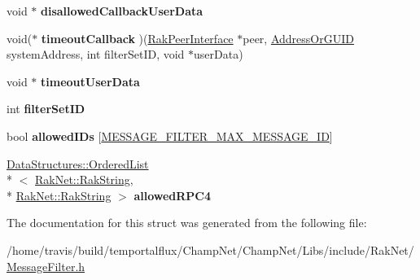 \begin{DoxyCompactItemize}
\item 
\hypertarget{struct_rak_net_1_1_filter_set_a129edc306a38a0da7f3c076ac57d080a}{void $\ast$ {\bfseries disallowed\-Callback\-User\-Data}}\label{struct_rak_net_1_1_filter_set_a129edc306a38a0da7f3c076ac57d080a}

\item 
\hypertarget{struct_rak_net_1_1_filter_set_a88e95116f31bcc26c9d7503fade848ce}{void($\ast$ {\bfseries timeout\-Callback} )(\hyperlink{class_rak_net_1_1_rak_peer_interface}{Rak\-Peer\-Interface} $\ast$peer, \hyperlink{struct_rak_net_1_1_address_or_g_u_i_d}{Address\-Or\-G\-U\-I\-D} system\-Address, int filter\-Set\-I\-D, void $\ast$user\-Data)}\label{struct_rak_net_1_1_filter_set_a88e95116f31bcc26c9d7503fade848ce}

\item 
\hypertarget{struct_rak_net_1_1_filter_set_a02579ee5db3d7cca001ee01515a26f77}{void $\ast$ {\bfseries timeout\-User\-Data}}\label{struct_rak_net_1_1_filter_set_a02579ee5db3d7cca001ee01515a26f77}

\item 
\hypertarget{struct_rak_net_1_1_filter_set_ad6e9bb439128307cbb82670ae4255fd8}{int {\bfseries filter\-Set\-I\-D}}\label{struct_rak_net_1_1_filter_set_ad6e9bb439128307cbb82670ae4255fd8}

\item 
\hypertarget{struct_rak_net_1_1_filter_set_af20d254436462095f204009313ec6b5a}{bool {\bfseries allowed\-I\-Ds} \mbox{[}\hyperlink{_message_filter_8h_ae4d315ced89fd4074f5e3b1b3e2a4e29}{M\-E\-S\-S\-A\-G\-E\-\_\-\-F\-I\-L\-T\-E\-R\-\_\-\-M\-A\-X\-\_\-\-M\-E\-S\-S\-A\-G\-E\-\_\-\-I\-D}\mbox{]}}\label{struct_rak_net_1_1_filter_set_af20d254436462095f204009313ec6b5a}

\item 
\hypertarget{struct_rak_net_1_1_filter_set_a6433375f96cb61c3f46a6de1c787a9f0}{\hyperlink{class_data_structures_1_1_ordered_list}{Data\-Structures\-::\-Ordered\-List}\\*
$<$ \hyperlink{class_rak_net_1_1_rak_string}{Rak\-Net\-::\-Rak\-String}, \\*
\hyperlink{class_rak_net_1_1_rak_string}{Rak\-Net\-::\-Rak\-String} $>$ {\bfseries allowed\-R\-P\-C4}}\label{struct_rak_net_1_1_filter_set_a6433375f96cb61c3f46a6de1c787a9f0}

\end{DoxyCompactItemize}


The documentation for this struct was generated from the following file\-:\begin{DoxyCompactItemize}
\item 
/home/travis/build/temportalflux/\-Champ\-Net/\-Champ\-Net/\-Libs/include/\-Rak\-Net/\hyperlink{_message_filter_8h}{Message\-Filter.\-h}\end{DoxyCompactItemize}
